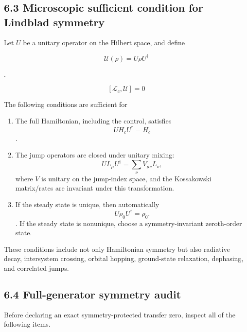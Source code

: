 \documentclass[
  10pt,
  a4paper,
]{article}
\providecommand{\tightlist}{%
  \setlength{\itemsep}{0pt}\setlength{\parskip}{0pt}}
\begin{document}
\subsection{6.3 Microscopic sufficient condition for Lindblad
symmetry}\label{microscopic-sufficient-condition-for-lindblad-symmetry}

Let \(U\) be a unitary operator on the Hilbert space, and define

\[
\mathscr U(\rho)=U\rho U^\dagger
\]

.

\[
[\mathcal L_c,\mathscr U]=0
\]

The following conditions are sufficient for

\begin{enumerate}
\def\labelenumi{\arabic{enumi}.}
\tightlist
\item
  The full Hamiltonian, including the control, satisfies \[
  U H_cU^\dagger=H_c
  \] .
\item
  The jump operators are closed under unitary mixing: \[
  UL_\mu U^\dagger
  =\sum_\nu V_{\mu\nu}L_\nu,
  \] where \(V\) is unitary on the jump-index space, and the Kossakowski
  matrix/rates are invariant under this transformation.
\item
  If the steady state is unique, then automatically \[
  U\rho_0U^\dagger=\rho_0.
  \] . If the steady state is nonunique, choose a symmetry-invariant
  zeroth-order state.
\end{enumerate}

These conditions include not only Hamiltonian symmetry but also
radiative decay, intersystem crossing, orbital hopping, ground-state
relaxation, dephasing, and correlated jumps.

\subsection{6.4 Full-generator symmetry
audit}\label{full-generator-symmetry-audit}

Before declaring an exact symmetry-protected transfer zero, inspect all
of the following items.
\end{document}
